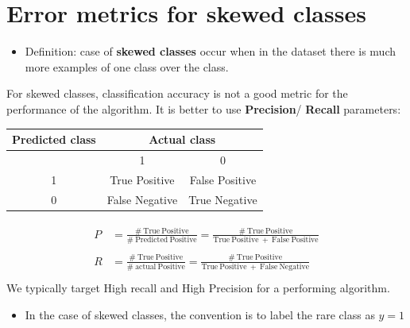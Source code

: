 \documentclass[a4paper,12pt]{report}
\begin{document}
\section{Error metrics for skewed classes}
\begin{itemize}
\item Definition: case of \textbf{skewed classes} occur when in the dataset there is much more examples of one class over the class.
\end{itemize}
For skewed classes, classification accuracy is not a good metric for the performance of the algorithm. It is better to use \textbf{Precision}/ \textbf{Recall} parameters:
\begin{table}[!htbp]
\centering
		\begin{tabular}[H]{|c|c|c|}
		  \hline
		 Predicted class & \multicolumn{2}{c}{Actual class} \\
		\hline
			& 1 & 0 \\
			\hline
			 1 & True Positive & False Positive \\
			\hline
			0 & False Negative & True Negative \\
			\hline
		\end{tabular}
\end{table}
\begin{align}
\begin{split}
P &= \frac{\mathrm{\# \ True\  Positive}}{\mathrm{\# \ Predicted\  Positive}} = \frac{\mathrm{\# \ True\  Positive}}{\mathrm{True \ Positive \ +\ False\  Positive}}\\
& \\
R &= \frac{\mathrm{\# \ True\  Positive}}{\mathrm{\# \ actual\  Positive}} = \frac{\mathrm{\# \ True\  Positive}}{\mathrm{True \ Positive \ +\ False\  Negative}}\\
\end{split}
\end{align}
We typically target High recall and High Precision for a performing algorithm.\\
\begin{itemize}
\item In the case of skewed classes, the convention is to label the rare class as $y=1$
\end{itemize}
\end{document}
